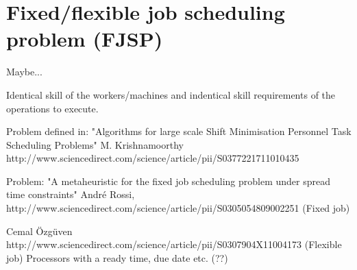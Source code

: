 \section{Fixed/flexible job scheduling problem (FJSP)}\label{FJSP}
Maybe...

Identical skill of the workers/machines and indentical skill requirements of the operations to execute.

Problem defined in: "Algorithms for large scale Shift Minimisation Personnel Task Scheduling Problems" M. Krishnamoorthy
http://www.sciencedirect.com/science/article/pii/S0377221711010435

Problem: "A metaheuristic for the fixed job scheduling problem under spread time constraints" André Rossi, http://www.sciencedirect.com/science/article/pii/S0305054809002251 (Fixed job)

Cemal Özgüven
http://www.sciencedirect.com/science/article/pii/S0307904X11004173 (Flexible job)
Processors with a ready time, due date etc. (??)





